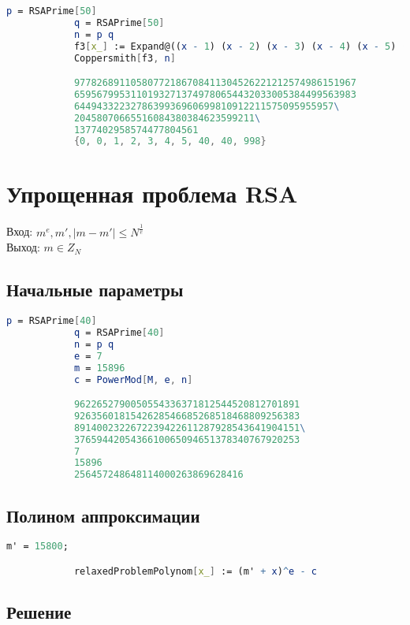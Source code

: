 	    	\begin{lstlisting}[language=Mathematica,caption={
	      		Пример	3
	    	}]
			p = RSAPrime[50]
			q = RSAPrime[50]
			n = p q
			f3[x_] := Expand@((x - 1) (x - 2) (x - 3) (x - 4) (x - 5) (x - 40) (x - 40) (x - 998) x)
			Coppersmith[f3, n]

			97782689110580772186708411304526221212574986151967
			65956799531101932713749780654432033005384499563983
			6449433223278639936960699810912211575095955957\
			20458070665516084380384623599211\
			1377402958574477804561
			{0, 0, 1, 2, 3, 4, 5, 40, 40, 998}
	    	\end{lstlisting}

	\section{Упрощенная проблема RSA}
		Вход: {$m^e, m', |m-m'| \le N^\frac{1}{e}$} \\   
  		Выход: {$m \in Z_N$}  

		\subsection{Начальные параметры}

			\begin{lstlisting}[language=Mathematica,caption={
	      		Начальные параметры
	    	}]
			p = RSAPrime[40]
			q = RSAPrime[40]
			n = p q
			e = 7
			m = 15896
			c = PowerMod[M, e, n]

			9622652790050554336371812544520812701891
			9263560181542628546685268518468809256383
			8914002322672239422611287928543641904151\
			3765944205436610065094651378340767920253
			7
			15896
			256457248648114000263869628416
	    	\end{lstlisting}

    	\subsection{Полином аппроксимации}

    		\begin{lstlisting}[language=Mathematica,caption={
	      		Полином аппроксимации
	    	}]
			m' = 15800;

			relaxedProblemPolynom[x_] := (m' + x)^e - c	
	    	\end{lstlisting}

    	\subsection{Решение}

